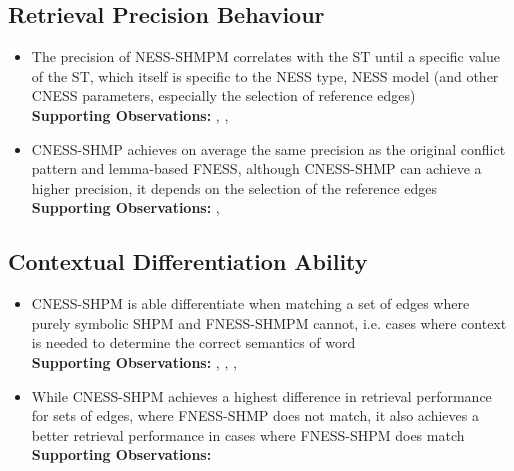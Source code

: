 \documentclass[11pt]{scrreprt}
\begin{document}
\subsection{Retrieval Precision Behaviour}

\begin{itemize}
	\item The precision of NESS-SHMPM correlates with the ST until a specific value of the ST, which itself is specific to the NESS type, NESS model (and other CNESS parameters, especially the selection of reference edges)
\\ \textbf{Supporting Observations:} , , 

\item CNESS-SHMP achieves on average the same precision as the original conflict pattern and lemma-based FNESS, although CNESS-SHMP can achieve a higher precision, it depends on the selection of the reference edges \\
\textbf{Supporting Observations:} , 


\end{itemize}

\subsection{Contextual Differentiation Ability}

\begin{itemize}
	\item CNESS-SHPM is able differentiate when matching a set of edges where purely symbolic SHPM and FNESS-SHMPM cannot, i.e. cases where context is needed to determine the correct semantics of word \\
	\textbf{Supporting Observations:} , , , 
	
	\item While CNESS-SHPM achieves a highest difference in retrieval performance for sets of edges, where FNESS-SHMP does not match, it also achieves a better retrieval performance in cases where FNESS-SHPM does match \\
	\textbf{Supporting Observations:}  
		
\end{itemize}
\end{document}
